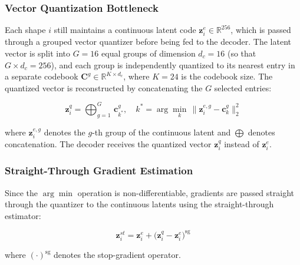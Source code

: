 \documentclass[11pt, a4paper]{article}
\begin{document}
\subsubsection{Vector Quantization Bottleneck}
Each shape $i$ still maintains a continuous latent code $\mathbf{z}_i^e \in \mathbb{R}^{256}$, which is passed through a grouped vector quantizer before being fed to the decoder. The latent vector is split into $G = 16$ equal groups of dimension $d_c = 16$ (so that $G \times d_c = 256$), and each group is independently quantized to its nearest entry in a separate codebook $\mathbf{C}^g \in \mathbb{R}^{K \times d_c}$, where $K = 24$ is the codebook size. The quantized vector is reconstructed by concatenating the $G$ selected entries:

\begin{equation}
    \mathbf{z}_i^q = \bigoplus_{g=1}^{G}\, \mathbf{c}^g_{k^*},
    \quad k^* = \arg\min_{k}\, \|\mathbf{z}_i^{e,g} - \mathbf{c}^g_k\|_2^2
\end{equation}

where $\mathbf{z}_i^{e,g}$ denotes the $g$-th group of the continuous latent and $\bigoplus$ denotes concatenation. The decoder receives the quantized vector $\mathbf{z}_i^q$ instead of $\mathbf{z}_i^e$.

\subsubsection{Straight-Through Gradient Estimation}
Since the $\arg\min$ operation is non-differentiable, gradients are passed straight through the quantizer to the continuous latents using the straight-through estimator:

\begin{equation}
    \mathbf{z}_i^{st} = \mathbf{z}_i^e + \bigl(\mathbf{z}_i^q - \mathbf{z}_i^e\bigr)^{\mathrm{sg}}
\end{equation}

where $(\cdot)^{\mathrm{sg}}$ denotes the stop-gradient operator.
\end{document}
